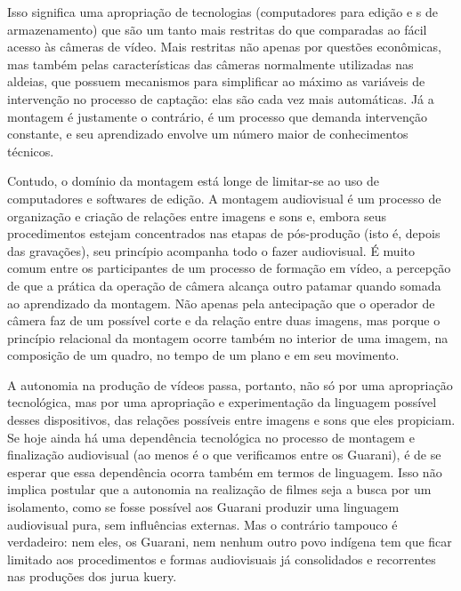 Isso significa uma apropriação de tecnologias (computadores para edição
e s de armazenamento) que são um tanto mais restritas do que
comparadas ao fácil acesso às câmeras de vídeo. Mais restritas não
apenas por questões econômicas, mas também pelas características das
câmeras normalmente utilizadas nas aldeias, que possuem mecanismos para
simplificar ao máximo as variáveis de intervenção no processo de
captação: elas são cada vez mais automáticas. Já a montagem é
justamente o contrário, é um processo que demanda intervenção
constante, e seu aprendizado envolve um número maior de conhecimentos
técnicos.

Contudo, o domínio da montagem está longe de limitar-se ao uso de
computadores e softwares de edição. A montagem audiovisual é um
processo de organização e criação de relações entre imagens e sons e,
embora seus procedimentos estejam concentrados nas etapas de
pós-produção (isto é, depois das gravações), seu princípio acompanha
todo o fazer audiovisual. É muito comum entre os participantes de um
processo de formação em vídeo, a percepção de que a prática da operação
de câmera alcança outro patamar quando somada ao aprendizado da
montagem. Não apenas pela antecipação que o operador de câmera faz de
um possível corte e da relação entre duas imagens, mas porque o
princípio relacional da montagem ocorre também no interior de uma
imagem, na composição de um quadro, no tempo de um plano e em seu
movimento.

A autonomia na produção de vídeos passa, portanto, não só por uma
apropriação tecnológica, mas por uma apropriação e experimentação da
linguagem possível desses dispositivos, das relações possíveis entre
imagens e sons que eles propiciam. Se hoje ainda há uma dependência
tecnológica no processo de montagem e finalização audiovisual (ao menos
é o que verificamos entre os Guarani), é de se esperar que essa
dependência ocorra também em termos de linguagem. Isso não implica
postular que a autonomia na realização de filmes seja a busca por um
isolamento, como se fosse possível aos Guarani produzir uma linguagem
audiovisual pura, sem influências externas. Mas o contrário tampouco é
verdadeiro: nem eles, os Guarani, nem nenhum outro povo indígena tem
que ficar limitado aos procedimentos e formas audiovisuais já
consolidados e recorrentes nas produções dos jurua kuery.

